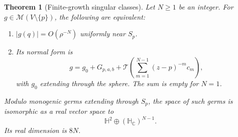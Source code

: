 \documentclass[11pt,a4paper]{article}
\numberwithin{equation}{section}
\newtheorem{theorem}{Theorem}[section]
\theoremstyle{definition}
\theoremstyle{remark}
\newcommand{\C}{\mathbb C}
\newcommand{\HH}{\mathbb H}
\newcommand{\HC}{\mathbb H_{\C}}
\newcommand{\cM}{\mathscr M}
\newcommand{\T}{\mathcal T}
\begin{document}
\begin{theorem}[Finite-growth singular classes]
\label{thm:growth}
Let $N\ge1$ be an integer. For $g\in\cM(V\setminus\{p\})$, the following
are equivalent:
\begin{enumerate}[label=\textup{(\roman*)}]
\item $|g(q)|=O(\rho^{-N})$ uniformly near $S_p$.
\item Its normal form is
\begin{equation}
 g=g_0+G_{p,a,b}
     +\T\left(\sum_{m=1}^{N-1}(z-p)^{-m}c_m\right),
 \label{eq:finiteform}
\end{equation}
with $g_0$ extending through the sphere. The sum is empty for $N=1$.
\end{enumerate}
Modulo monogenic germs extending through $S_p$, the space of such germs is
isomorphic as a real vector space to
\begin{equation}
 \HH^2\oplus(\HC)^{N-1}.
 \label{eq:germspace}
\end{equation}
Its real dimension is $8N$.
\end{theorem}
\end{document}
